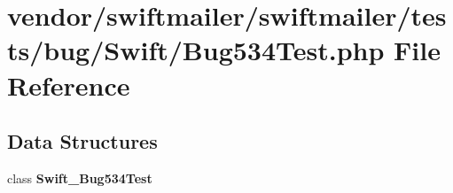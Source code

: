 \section{vendor/swiftmailer/swiftmailer/tests/bug/\+Swift/\+Bug534\+Test.php File Reference}
\label{_bug534_test_8php}
\subsection*{Data Structures}
\begin{DoxyCompactItemize}
\item 
class {\bf Swift\+\_\+\+Bug534\+Test}
\end{DoxyCompactItemize}
